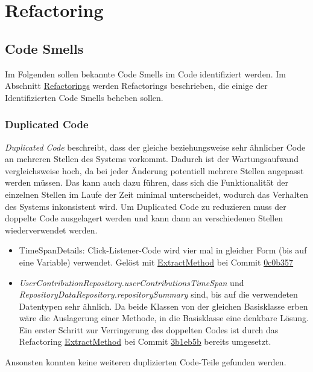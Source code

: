 \chapter{Refactoring}

\section{Code Smells} 

Im Folgenden sollen bekannte Code Smells im Code identifiziert werden. Im Abschnitt \hyperref[sec:Refactorings]{Refactorings} werden Refactorings beschrieben, die einige der Identifizierten Code Smells beheben sollen.


\subsection{Duplicated Code}

\textit{Duplicated Code} beschreibt, dass der gleiche beziehungsweise sehr ähnlicher Code an mehreren Stellen des Systems vorkommt.
Dadurch ist der Wartungsaufwand vergleichsweise hoch, da bei jeder Änderung potentiell mehrere Stellen angepasst werden müssen. Das kann auch dazu führen, dass sich die Funktionalität der einzelnen Stellen im Laufe der Zeit minimal unterscheidet, wodurch das Verhalten des Systems inkonsistent wird.
Um Duplicated Code zu reduzieren muss der doppelte Code ausgelagert werden und kann dann an verschiedenen Stellen wiederverwendet werden.

\begin{itemize}
	\item{TimeSpanDetails: Click-Listener-Code wird vier mal in gleicher Form (bis auf eine Variable) verwendet. Gelöst mit {\hyperref[sec:ExtractMethod_TimeSpanDetails]{ExtractMethod}} bei Commit \href{https://github.com/lukaspanni/OpenSourceStats/commit/0c0b357dee742575d8465ae26e64152bfecbf5ab} {0c0b357}}
	
	\item{\textit{UserContributionRepository.userContributionsTimeSpan} und \textit{RepositoryDataRepository.repositorySummary} sind, bis auf die verwendeten Datentypen sehr ähnlich. 
Da beide Klassen von der gleichen Basisklasse erben wäre die Auslagerung einer Methode, in die Basisklasse eine denkbare Lösung.
\newline
Ein erster Schritt zur Verringerung des doppelten Codes ist durch das Refactoring {\hyperref[sec:ExtractMethod_Repository]{ExtractMethod}} bei Commit \href{https://github.com/lukaspanni/OpenSourceStats/commit/3b1eb5bf6750c3ccaeb05962ec8a8ae743adbf2c} {3b1eb5b} bereits umgesetzt.} 		
\end{itemize}
Ansonsten konnten keine weiteren duplizierten Code-Teile gefunden werden.

